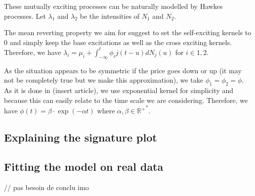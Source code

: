 \documentclass[a4paper,12pt,twoside]{article}
\begin{document}
These mutually exciting processes can be naturally modelled by Hawkes processes. Let $\lambda_1$ and $\lambda_2$ be the intensities of $N_1$ and $N_2$. 

The mean reverting property we aim for suggest to set the self-exciting kernels to 0 and simply keep the base excitations as well as the cross exciting kernels. Therefore, we have $\lambda_i = \mu_i + \int_{-\infty}^{t} \phi_ij(t-u)dN_j(u)$ for $i \in {1, 2}$.

As the situation appears to be symmetric if the price goes down or up (it may not be completely true but we make this approximation), we take $\phi_1 = \phi_2 = \phi$. As it is done in (insert article), we use exponential kernel for simplicity and because this can easily relate to the time scale we are considering. Therefore, we have $\phi(t) = \beta \cdot \exp(-\alpha t)$ where $\alpha, \beta \in \mathbb{{R^{+}}^*}$.



\subsection{Explaining the signature plot}

\subsection{Fitting the model on real data}


// pas besoin de conclu imo

\begin{thebibliography}{}
    
    
\end{thebibliography}	
\end{document}
